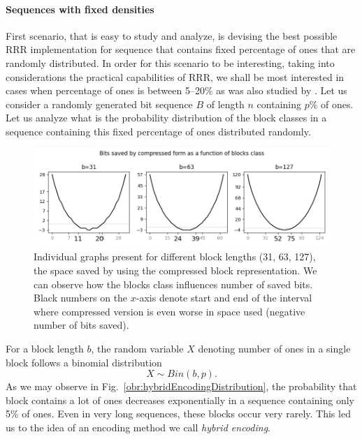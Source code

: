 \paragraph{Sequences with fixed densities}

First scenario, that is easy to study and analyze, is devising the best possible RRR
implementation for sequence that contains fixed percentage of ones that are randomly
distributed. In order for this scenario to be interesting, taking into considerations
the practical capabilities of RRR, we shall be most interested in cases when percentage 
of ones is between 5--20\% as was also studied by \cite{navarro2012fast}. Let us consider
a randomly generated bit sequence $B$ of length $n$ containing $p\%$ of ones. Let us
analyze what is the probability distribution of the block classes in a sequence containing
this fixed percentage of ones distributed randomly.
\begin{figure}
	\centerline{
		\includegraphics[width=\textwidth]{images/rrr_space_savings}
	}
	\caption[TODO]{Individual graphs present for different block lengths (31, 63, 127), 
    the space saved by using the compressed block representation. We can observe how
    the blocks class influences number of saved bits. Black numbers on the $x$-axis
    denote start and end of the interval where compressed version is even worse
    in space used (negative number of bits saved).
	}
	\label{obr:rrrSpaceSavings}
\end{figure}

For a block length $b$, the random variable $X$ denoting number of ones in a single
block follows a binomial distribution $$X \sim Bin(b, p).$$ As we may observe in
Fig.~\ref{obr:hybridEncodingDistribution}, the probability that block contains
a lot of ones decreases exponentially in a sequence containing only 5\% of ones.
Even in very long sequences, these blocks occur very rarely. This led us to the
idea of an encoding method we call \textit{hybrid encoding}.

